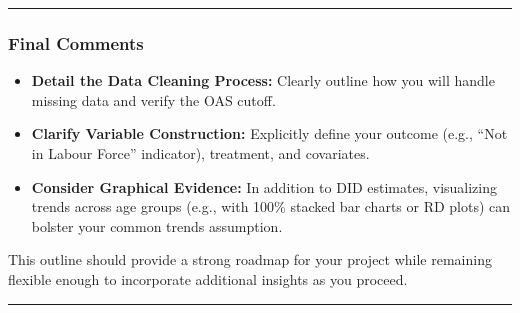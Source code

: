 \documentclass[
]{article}
\providecommand{\tightlist}{%
  \setlength{\itemsep}{0pt}\setlength{\parskip}{0pt}}
\begin{document}
\begin{center}\rule{0.5\linewidth}{0.5pt}\end{center}

\subsubsection{Final Comments}\label{final-comments}

\begin{itemize}
\tightlist
\item
  \textbf{Detail the Data Cleaning Process:} Clearly outline how you
  will handle missing data and verify the OAS cutoff.
\item
  \textbf{Clarify Variable Construction:} Explicitly define your outcome
  (e.g., ``Not in Labour Force'' indicator), treatment, and covariates.
\item
  \textbf{Consider Graphical Evidence:} In addition to DID estimates,
  visualizing trends across age groups (e.g., with 100\% stacked bar
  charts or RD plots) can bolster your common trends assumption.
\end{itemize}

This outline should provide a strong roadmap for your project while
remaining flexible enough to incorporate additional insights as you
proceed.

\begin{center}\rule{0.5\linewidth}{0.5pt}\end{center}
\end{document}
